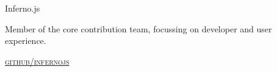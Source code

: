 {\raggedright
  {\large {
    Inferno.js
  } \\}


  Member of the core contribution team, focussing on developer and user experience. 

  \textsc{\small\href{http://github.com/infernojs}{github/infernojs}}
} \\
